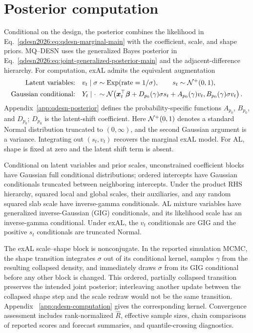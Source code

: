 
\section{Posterior computation}
\label{qdesn2026:sec:inference}

Conditional on the design, the posterior combines the likelihood in
Eq.~\eqref{qdesn2026:eq:qdesn-marginal-main} with the coefficient, scale, and shape
priors. MQ--DESN uses the generalized Bayes posterior in
Eq.~\eqref{qdesn2026:eq:joint-generalized-posterior-main} and the adjacent-difference
hierarchy. For computation, exAL admits the equivalent
augmentation
\begin{equation}
\begin{alignedat}{2}
\text{Latent variables:}\quad
&v_t\mid\sigma&&\sim\operatorname{Exp}(\mathrm{rate}=1/\sigma),
\qquad s_t\sim\mathcal{N}^{+}(0,1),\\
\text{Gaussian conditional:}\quad
&Y_t\mid\cdot&&\sim\mathcal{N}\!\left(
\boldsymbol{x}_t^\top\boldsymbol{\beta}+D_{p_0}(\gamma)\sigma s_t
+A_{p_0}(\gamma)v_t,
B_{p_0}(\gamma)\sigma v_t\right).
\end{alignedat}
\label{qdesn2026:eq:qdesn-aug}
\end{equation}
Appendix~\ref{app:qdesn-posterior} defines the
probability-specific functions \(A_{p_0}\), \(B_{p_0}\), and \(D_{p_0}\);
\(D_{p_0}\) is the latent-shift coefficient. Here \(\mathcal{N}^{+}(0,1)\) denotes a
standard Normal distribution truncated to \((0,\infty)\), and the second
Gaussian argument is a variance.
Integrating out \((s_t,v_t)\) recovers the marginal exAL model. For AL,
shape is fixed at zero and the latent shift term is absent.

Conditional on latent variables and prior scales, unconstrained coefficient
blocks have Gaussian full conditional distributions; ordered intercepts have
Gaussian conditionals truncated between neighboring intercepts. Under the
product RHS hierarchy, squared local and global scales, their auxiliaries, and
any random squared slab scale have inverse-gamma conditionals. AL mixture
variables have generalized inverse-Gaussian (GIG) conditionals, and its
likelihood scale has an inverse-gamma conditional. Under exAL, the \(v_t\)
conditionals are GIG and the positive \(s_t\) conditionals are truncated
Normal.

The exAL scale--shape block is nonconjugate. In the reported simulation MCMC,
the shape transition integrates \(\sigma\) out of its conditional kernel,
samples \(\gamma\) from the resulting collapsed density, and immediately
draws \(\sigma\) from its GIG conditional before any other block is changed.
This ordered, partially collapsed transition preserves the intended joint
posterior; interleaving another update between the collapsed shape step and
the scale redraw would not be the same transition. Appendix~%
\ref{app:qdesn-computation} gives the corresponding kernel. Convergence
assessment includes rank-normalized
\(\widehat R\), effective sample sizes, chain comparisons of reported
scores and forecast summaries, and quantile-crossing diagnostics.

